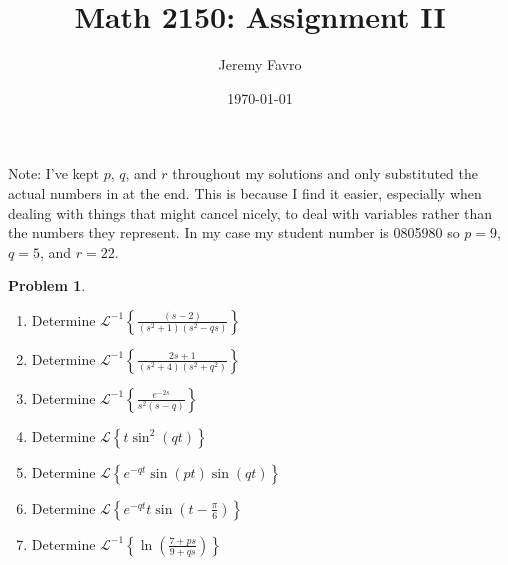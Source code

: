 \documentclass[10pt]{article}
\title{Math 2150: Assignment II}
\author{Jeremy Favro}
\date{\today}
\theoremstyle{definition}
\newtheorem{problem}{Problem}
\newcommand{\laplace}{\mathcal{L}}
\begin{document}
\maketitle
\noindent Note: I've kept $p$, $q$, and $r$ throughout my solutions and only substituted the actual numbers in at the end. This is because I find it easier,
especially when dealing with things that might cancel nicely, to deal with variables rather than the numbers they represent. In my case my
student number is 0805980 so $p=9$, $q=5$, and $r=22$.
\\
\begin{problem}~
\begin{enumerate}[label=(\alph*)]
  \item Determine $\laplace^{-1}\left\{\frac{\left(s-2\right)}{\left(s^2+1\right)\left(s^2-qs\right)}\right\}$
  \item Determine $\laplace^{-1}\left\{\frac{2s+1}{\left(s^2+4\right)\left(s^2+q^2\right)}\right\}$
  \item Determine $\laplace^{-1}\left\{\frac{e^{-2s}}{s^2\left(s-q\right)}\right\}$
  \item Determine $\laplace\left\{t\sin^2\left(qt\right)\right\}$
  \item Determine $\laplace\left\{e^{-qt}\sin\left(pt\right)\sin\left(qt\right)\right\}$
  \item Determine $\laplace\left\{e^{-qt}t\sin\left(t-\frac{\pi}{6}\right)\right\}$
  \item Determine $\laplace^{-1}\left\{\ln\left(\frac{7+ps}{9+qs}\right)\right\}$
\end{enumerate}
\end{problem}
\end{document}
